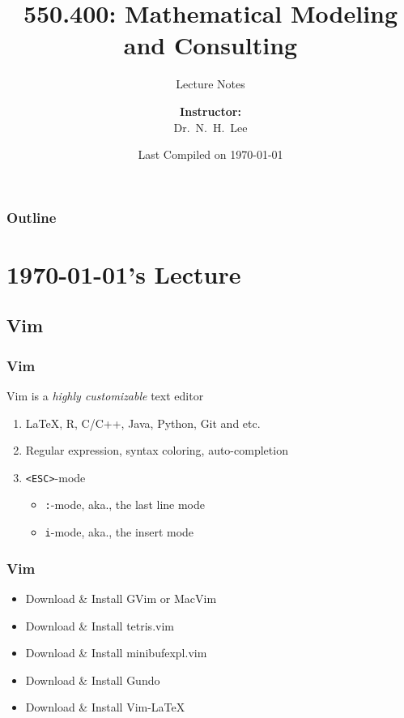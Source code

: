 \documentclass[hyperref={colorlinks=false},handout,10pt]{beamer}
\title{{\color{blue} \LARGE 550.400: Mathematical Modeling and Consulting\newline} }
\subtitle{{\color{red} \large Lecture Notes} }
\author{ 
    {\bf{Instructor:}} \\ 
Dr.~N.~H.~Lee \\ 
    \vspace{5pt}
}
\institute{JHU AMS 2012 FALL}
\date{\mygreen Last Compiled on \today}
\let\olditem\item
\renewcommand{\item}{\setlength{\itemsep}{0.5\baselineskip}\olditem}
\begin{document}
\begin{frame}[plain]
  \titlepage
\end{frame}

\begin{frame}
  \frametitle{Outline}
  \tableofcontents
\end{frame}

\section{\today's Lecture}
\subsection{Vim}

\begin{frame}
    \frametitle{Vim}
    \begin{block}
        {Vim is a \emph{highly customizable} text editor}
    \vskip0.1in
    \begin{enumerate}
        \item \LaTeX, R, C/C++, Java, Python, Git and etc.
        \item Regular expression, syntax coloring, auto-completion
        \item \texttt{<ESC>}-mode
        \begin{itemize}
            \item \texttt{:}-mode, aka., the last line mode
            \item \texttt{i}-mode, aka., the insert mode
        \end{itemize}
    \end{enumerate}
    \end{block}
\end{frame}

\begin{frame}
    \frametitle{Vim}
    \begin{itemize}
        \item Download \& Install GVim or MacVim
        \item Download \& Install tetris.vim
        \item Download \& Install minibufexpl.vim
        \item Download \& Install Gundo 
        \item Download \& Install Vim-LaTeX
    \end{itemize}
\end{frame}
\end{document}
